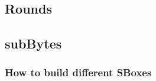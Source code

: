 \documentclass[a4paper,twoside]{llncs}
\begin{document}
\subsection{Rounds}

\subsection{subBytes}

\subsubsection{How to build different SBoxes}
\end{document}
